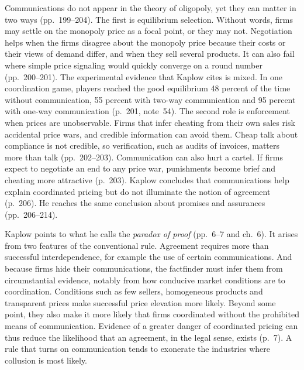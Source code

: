 Communications do not appear in the theory of oligopoly, yet they can matter in two ways (pp.~199--204). The first is
equilibrium selection. Without words, firms may settle on the monopoly price as a focal point, or they may not.
Negotiation helps when the firms disagree about the monopoly price because their costs or their views of demand
differ, and when they sell several products. It can also fail where simple price signaling would quickly converge on
a round number (pp.~200--201). The experimental evidence that Kaplow cites is mixed. In one coordination game,
players reached the good equilibrium 48 percent of the time without communication, 55 percent with two-way
communication and 95 percent with one-way communication (p.~201, note~54). The second role is enforcement when
prices are unobservable. Firms that infer cheating from their own sales risk accidental price wars, and credible
information can avoid them. Cheap talk about compliance is not credible, so verification, such as audits of
invoices, matters more than talk (pp.~202--203). Communication can also hurt a cartel. If firms expect to negotiate
an end to any price war, punishments become brief and cheating more attractive (p.~203). Kaplow concludes that
communications help explain coordinated pricing but do not illuminate the notion of agreement (p.~206). He reaches
the same conclusion about promises and assurances (pp.~206--214).

Kaplow points to what he calls the \emph{paradox of proof} (pp.~6--7 and ch.~6). It arises from two features of the
conventional rule. Agreement requires more than successful interdependence, for example the use of certain
communications. And because firms hide their communications, the factfinder must infer them from circumstantial
evidence, notably from how conducive market conditions are to coordination. Conditions such as few sellers,
homogeneous products and transparent prices make successful price elevation more likely. Beyond some point, they
also make it more likely that firms coordinated without the prohibited means of communication. Evidence of a
greater danger of coordinated pricing can thus reduce the likelihood that an agreement, in the legal sense, exists
(p.~7). A rule that turns on communication tends to exonerate the industries where collusion is most likely.

